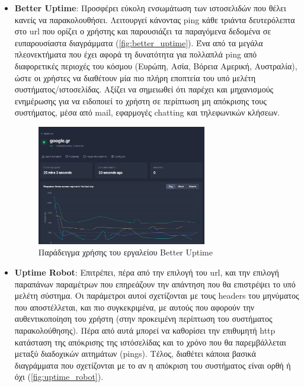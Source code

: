 \begin{itemize}
	\item \textbf{Better Uptime}: Προσφέρει εύκολη ενσωμάτωση των ιστοσελιδών που θέλει κανείς να παρακολουθήσει.
	      Λειτουργεί κάνοντας ping κάθε τριάντα δευτερόλεπτα στο url που ορίζει ο χρήστης και παρουσιάζει
	      τα παραγόμενα δεδομένα σε ευπαρουσίαστα διαγράμματα (\autoref{fig:better_uptime}). Ένα από τα μεγάλα πλεονεκτήματα που έχει αφορά
	      τη δυνατότητα για πολλαπλά ping από διαφορετικές περιοχές του κόσμου (Ευρώπη, Ασία, Βόρεια Αμερική, Αυστραλία),
	      ώστε οι χρήστες να διαθέτουν μία πιο πλήρη εποπτεία του υπό μελέτη συστήματος/ιστοσελίδας. Αξίζει να σημειωθεί
	      ότι παρέχει και μηχανισμούς ενημέρωσης για να ειδοποιεί το χρήστη σε περίπτωση μη απόκρισης τους συστήματος, μέσα
	      από mail, εφαρμογές chatting και τηλεφωνικών κλήσεων.
	      \begin{figure}[!ht]
		      \centering
		      \includegraphics[width=0.7\textwidth]{./images/chapter3/better-uptime-cropped.png}
		      \caption[Παράδειγμα χρήσης του εργαλείου Better Uptime]{Παράδειγμα χρήσης του εργαλείου Better Uptime}
		      \label{fig:better_uptime}
	      \end{figure}
	\item \textbf{Uptime Robot}: Επιτρέπει, πέρα από την επιλογή του url, και την επιλογή παραπάνων παραμέτρων που επηρεάζουν
	      την απάντηση που θα επιστρέψει το υπό μελέτη σύστημα. Οι παράμετροι αυτοί σχετίζονται με τους headers του μηνύματος που
	      αποστέλλεται, και πιο συγκεκριμένα, με αυτούς που αφορούν την αυθεντικοποίηση του χρήστη (στην προκειμένη περίπτωση
	      του συστήματος παρακολούθησης). Πέρα από αυτά μπορεί να καθορίσει την επιθυμητή http κατάσταση της απόκρισης
	      της ιστόσελίδας και το χρόνο που θα παρεμβάλλεται μεταξύ διαδοχικών αιτημάτων (pings). Τέλος, διαθέτει κάποια βασικά διαγράμματα
	      που σχετίζονται με το αν η απόκριση του συστήματος είναι ορθή ή όχι (\autoref{fig:uptime_robot}).

\end{itemize}
